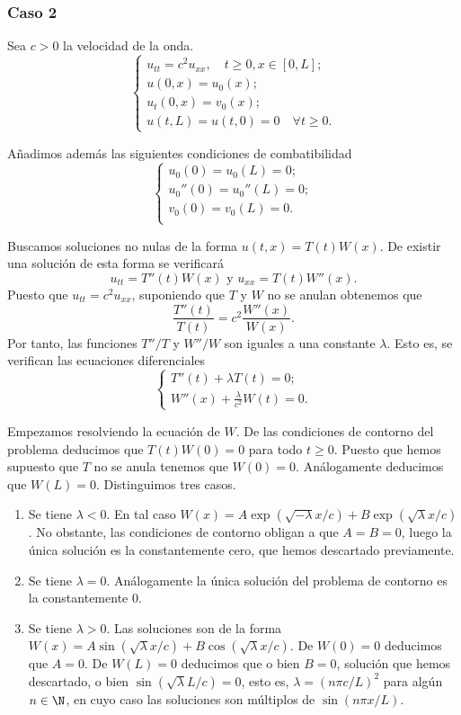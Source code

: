 \documentclass{article}
\begin{document}
\subsubsection{Caso 2}

Sea $c > 0$ la velocidad de la onda.
\begin{equation}
  \label{eq:ondas:2}
  \begin{cases}
    u_{tt} = c^2 u_{xx}, \quad t \ge 0, x \in [0,L]; \\
    u(0,x) = u_0(x); \\
    u_t(0,x) = v_0(x); \\
    u(t,L) = u(t,0) = 0 \quad \forall t \ge 0.
  \end{cases}
\end{equation}

Añadimos además las siguientes condiciones de combatibilidad
\[
  \begin{cases}
    u_0(0) = u_0(L) = 0; \\
    u_0''(0) = u_0''(L) = 0; \\
    v_0(0) = v_0(L) = 0. \\
  \end{cases}
\]

Buscamos soluciones no nulas de la forma $u(t,x) = T(t) W(x)$. De existir una solución de esta forma
se verificará
\[ u_{tt} = T''(t) W(x) \text{ y } u_{xx} = T(t) W''(x). \] Puesto que $u_{tt} = c^2 u_{xx}$,
suponiendo que $T$ y $W$ no se anulan obtenemos que
\[ \frac{T''(t)}{T(t)} = c^2 \frac{W''(x)}{W(x)}. \] Por tanto, las funciones $T''/T$ y $W''/W$ son
iguales a una constante $\lambda$. Esto es, se verifican las ecuaciones diferenciales
\[
  \begin{cases}
    T''(t) + \lambda T(t) = 0; \\
    W''(x) + \frac{\lambda}{c^2} W(t) = 0.
  \end{cases}
\]

Empezamos resolviendo la ecuación de $W$. De las condiciones de contorno del problema deducimos que
$T(t)W(0) = 0$ para todo $t \ge 0$. Puesto que hemos supuesto que $T$ no se anula tenemos que
$W(0) = 0$. Análogamente deducimos que $W(L) = 0$. Distinguimos tres casos.
\begin{enumerate}
\item Se tiene $\lambda < 0$. En tal caso
  $W(x) = A \exp(\sqrt{-\lambda} x / c) + B \exp(\sqrt{\lambda} x / c)$. No obstante, las
  condiciones de contorno obligan a que $A = B = 0$, luego la única solución es la constantemente
  cero, que hemos descartado previamente.
\item Se tiene $\lambda = 0$. Análogamente la única solución del problema de contorno es la
  constantemente $0$.
\item Se tiene $\lambda > 0$. Las soluciones son de la forma
  $W(x) = A \sin(\sqrt{\lambda} x / c) + B \cos(\sqrt{\lambda} x / c)$. De $W(0) = 0$ deducimos que
  $A = 0$. De $W(L) = 0$ deducimos que o bien $B = 0$, solución que hemos descartado, o bien
  $\sin(\sqrt{\lambda} L / c) = 0$, esto es, $\lambda = (n \pi c / L)^{2}$ para algún $n \in \N$, en
  cuyo caso las soluciones son múltiplos de $\sin(n \pi x / L)$.
\end{enumerate}
\end{document}
